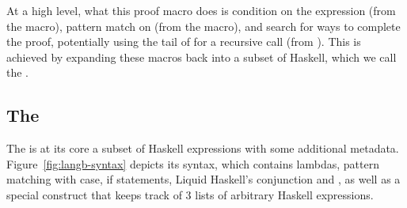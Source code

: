 At a high level, what this proof macro does is condition on the
expression  (from the  macro), pattern match
on  (from the  macro), and search for ways to
complete the proof, potentially using the tail of  for a
recursive call (from ). This is achieved by expanding these
macros back into a subset of Haskell, which we call the {\em \LangB}.

\subsection{The \LangB}

The \LangB is at its core a subset of Haskell expressions with some
additional metadata.  Figure~\ref{fig:langb-syntax} depicts its
syntax, which contains lambdas, pattern matching with case, if
statements, Liquid Haskell's conjunction \LC{&&&} and , as
well as a special construct  that keeps track of 3 lists of
arbitrary Haskell expressions. 

